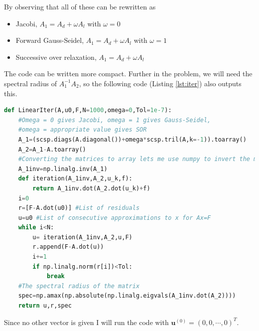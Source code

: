 \documentclass[12pt, a4paper,usenames,dvipsnames]{article}
\renewcommand\vec{\mathbf}
\begin{document}
By observing that all of these can be rewritten as 
\begin{itemize}
    \item Jacobi, \(A_1=A_d+\omega A_l\) with \(\omega=0\)
    \item Forward Gauss-Seidel, \(A_1=A_d+\omega A_l\) with \(\omega=1\)
    \item Successive over relaxation, \(A_1=A_d+\omega A_l\) 
\end{itemize}
The code can be written more compact. Further in the problem, we will need the spectral radius of \(A_1^{-1}A_2\), so the following code (Listing \ref{lst:iter}) also outputs this.
\begin{lstlisting}[language=python,caption=The function implementing the iterative methods.,label=lst:iter]
def LinearIter(A,u0,F,N=1000,omega=0,Tol=1e-7):
    #Omega = 0 gives Jacobi, omega = 1 gives Gauss-Seidel, 
    #omega = appropriate value gives SOR
    A_1=(scsp.diags(A.diagonal())+omega*scsp.tril(A,k=-1)).toarray()
    A_2=A_1-A.toarray()
    #Converting the matrices to array lets me use numpy to invert the matrix
    A_1inv=np.linalg.inv(A_1)
    def iteration(A_1inv,A_2,u_k,f):
        return A_1inv.dot(A_2.dot(u_k)+f)
    i=0
    r=[F-A.dot(u0)] #List of residuals
    u=u0 #List of consecutive approximations to x for Ax=F
    while i<N:
        u= iteration(A_1inv,A_2,u,F)
        r.append(F-A.dot(u))
        i+=1
        if np.linalg.norm(r[i])<Tol:
            break
    #The spectral radius of the matrix
    spec=np.amax(np.absolute(np.linalg.eigvals(A_1inv.dot(A_2))))
    return u,r,spec
\end{lstlisting}

Since no other vector is given I will run the code with \(\vec{u}^{(0)}=(0,0,\cdots,0)^T\).
\end{document}
